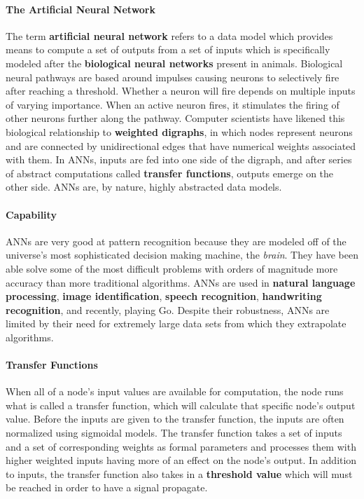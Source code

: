\documentclass[letterpaper, 10pt]{article}
\begin{document}
	\paragraph{The Artificial Neural Network}
		 The term \textbf{artificial neural network} refers to a data model which provides means to compute a set of outputs from a set of inputs which is specifically modeled after the \textbf{biological neural networks} present in animals. Biological neural pathways are based around impulses causing neurons to selectively fire after reaching a threshold. Whether a neuron will fire depends on multiple inputs of varying importance. When an active neuron fires, it stimulates the firing of other neurons further along the pathway. Computer scientists have likened this biological relationship to \textbf{weighted digraphs}, in which nodes represent neurons and are connected by unidirectional edges that have numerical weights associated with them. In ANNs, inputs are fed into one side of the digraph, and after series of abstract computations called \textbf{transfer functions}, outputs emerge on the other side. ANNs are, by nature, highly abstracted data models.
	\paragraph{Capability}
	ANNs are very good at pattern recognition because they are modeled off of the universe's most sophisticated decision making machine, the \emph{brain}. They have been able solve some of the most difficult problems with orders of magnitude more accuracy than more traditional algorithms. ANNs are used in \textbf{natural language processing}, \textbf{image identification}, \textbf{speech recognition}, \textbf{handwriting recognition}, and recently, playing Go. Despite their robustness, ANNs are limited by their need for extremely large data sets from which they extrapolate algorithms.
	\paragraph{Transfer Functions}
	When all of a node's input values are available for computation, the node runs what is called a transfer function, which will calculate that specific node's output value. Before the inputs are given to the transfer function, the inputs are often normalized using sigmoidal models. The transfer function takes a set of inputs and a set of corresponding weights as formal parameters and processes them with higher weighted inputs having more of an effect on the node's output. In addition to inputs, the transfer function also takes in a \textbf{threshold value} which will must be reached in order to have a signal propagate.
\end{document}
